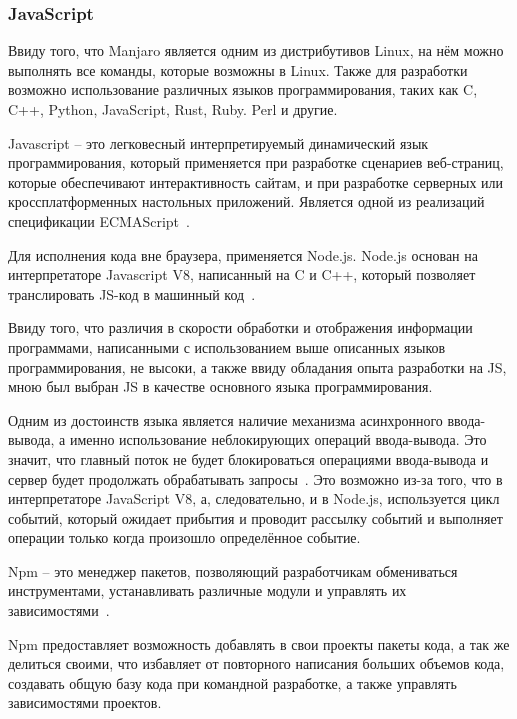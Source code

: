 \subsubsection{JavaScript}

Ввиду того, что Manjaro является одним из дистрибутивов Linux, на нём можно выполнять все команды, которые возможны в Linux. Также для разработки возможно использование различных языков программирования, таких как C, C++, Python, JavaScript, Rust, Ruby. Perl и другие. 

Javascript -- это легковесный интерпретируемый динамический язык программирования, который применяется при разработке сценариев веб-страниц, которые обеспечивают интерактивность сайтам, и при разработке серверных или кроссплатформенных настольных приложений. Является одной из реализаций спецификации ECMAScript~\cite{JS}.

Для исполнения кода вне браузера, применяется Node.js. Node.js основан на интерпретаторе Javascript V8, написанный на C и C++, который позволяет транслировать JS-код в машинный код~\cite{node}.

Ввиду того, что различия в скорости обработки и отображения информации программами, написанными с использованием выше описанных языков программирования, не высоки, а также ввиду обладания опыта разработки на JS, мною был выбран JS в качестве основного языка программирования.

Одним из достоинств языка является наличие механизма асинхронного ввода-вывода, а именно использование неблокирующих операций ввода-вывода. Это значит, что главный поток не будет блокироваться операциями ввода-вывода и сервер будет продолжать обрабатывать запросы~\cite{node}. Это возможно из-за того, что в интерпретаторе JavaScript V8, а, следовательно, и в Node.js, используется цикл событий, который ожидает прибытия и проводит рассылку событий и выполняет операции только когда произошло определённое событие.

Npm -- это менеджер пакетов, позволяющий разработчикам обмениваться инструментами, устанавливать различные модули и управлять их зависимостями~\cite{npm}.

Npm предоставляет возможность добавлять в свои проекты пакеты кода, а так же делиться своими, что избавляет от повторного написания больших объемов кода, создавать общую базу кода при командной разработке, а также управлять зависимостями проектов.
